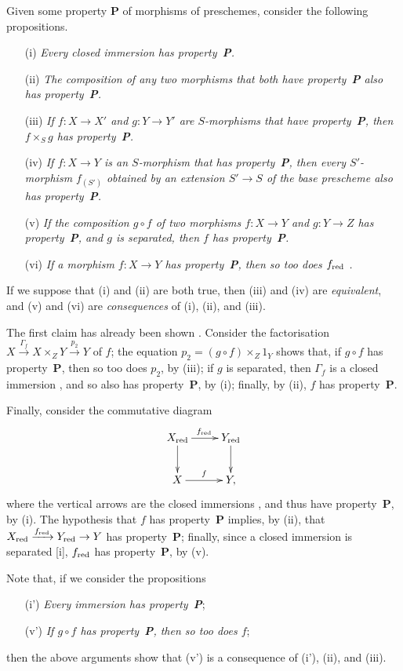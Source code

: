 \begin{remark}[5.5.12]
\label{1.5.5.12}
Given some property \textbf{P} of morphisms of preschemes, consider the following propositions.
\begin{enumerate}
  \item[(i)] \emph{Every closed immersion has property~\textbf{P}.}
  \item[(ii)] \emph{The composition of any two morphisms that both have property~\textbf{P} also has property~\textbf{P}.}
  \item[(iii)] \emph{If $f:X\to X'$ and $g:Y\to Y'$ are $S$-morphisms that have property~\textbf{P}, then $f\times_S g$ has property~\textbf{P}.}
  \item[(iv)] \emph{If $f:X\to Y$ is an $S$-morphism that has property~\textbf{P}, then every $S'$-morphism $f_{(S')}$ obtained by an extension $S'\to S$ of the base prescheme also has property~\textbf{P}.}
  \item[(v)] \emph{If the composition $g\circ f$ of two morphisms $f:X\to Y$ and $g:Y\to Z$ has property~\textbf{P}, and $g$ is separated, then $f$ has property~\textbf{P}.}
  \item[(vi)] \emph{If a morphism $f:X\to Y$ has property~\textbf{P}, then so too does $f_{\mathrm{red}}$ .}
\end{enumerate}
If we suppose that (i) and (ii) are both true, then (iii) and (iv) are \emph{equivalent}, and (v) and (vi) are \emph{consequences} of (i), (ii), and (iii).

The first claim has already been shown .
Consider the factorisation  $X\xrightarrow{\Gamma_f}X\times_Z Y\xrightarrow{p_2}Y$ of $f$;
the equation $p_2=(g\circ f)\times_Z 1_Y$ shows that, if $g\circ f$ has property~\textbf{P}, then so too does $p_2$, by (iii);
if $g$ is separated, then $\Gamma_f$ is a closed immersion , and so also has property~\textbf{P}, by (i);
finally, by (ii), $f$ has property~\textbf{P}.

Finally, consider the commutative diagram
\[
  \xymatrix{
    X_\red\ar[r]^{f_\red}\ar[d] &
    Y_\red\ar[d]\\
    X\ar[r]^f &
    Y,
  }
\]
where the vertical arrows are the closed immersions , and thus have property~\textbf{P}, by (i).
The hypothesis that $f$ has property~\textbf{P} implies, by (ii), that $X_\red\xrightarrow{f_\red}Y_\red\to Y$ has property~\textbf{P};
finally, since a closed immersion is separated [i], $f_{\mathrm{red}}$ has property~\textbf{P}, by (v).

Note that, if we consider the propositions
\begin{enumerate}
  \item[(i')] \emph{Every immersion has property~\textbf{P}};
  \item[(v')] \emph{If $g\circ f$ has property~\textbf{P}, then so too does $f$};
\end{enumerate}
then the above arguments show that (v') is a consequence of (i'), (ii), and (iii).
\end{remark}

